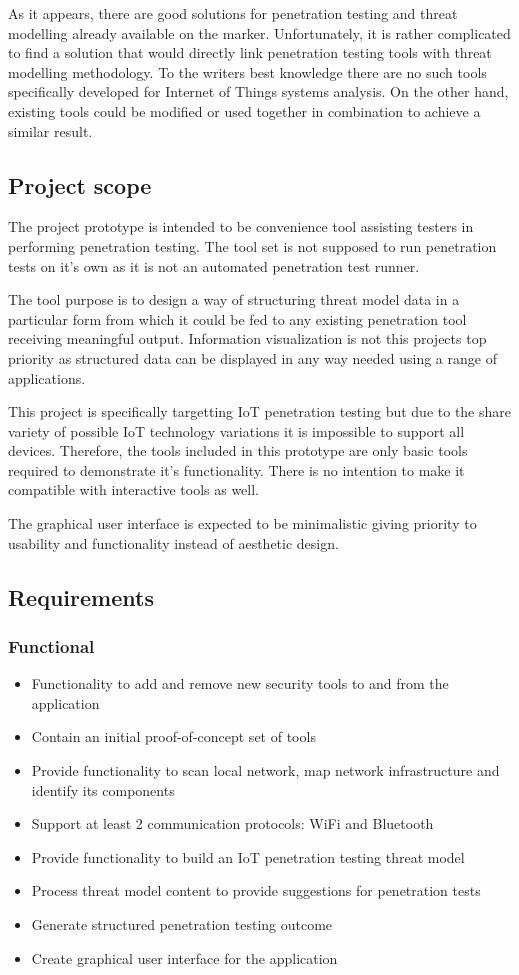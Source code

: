 	As it appears, there are good solutions for penetration testing and threat modelling already available on the marker. Unfortunately, it is rather complicated to find a solution that would directly link penetration testing tools with threat modelling methodology. To the writers best knowledge there are no such tools specifically developed for Internet of Things systems analysis. On the other hand, existing tools could be modified or used together in combination to achieve a similar result.


\subsection{Project scope}
	The project prototype is intended to be convenience tool assisting testers in performing penetration testing. The tool set is not supposed to run penetration tests on it's own as it is not an automated penetration test runner. 
	
	The tool purpose is to design a way of structuring threat model data in a particular form from which it could be fed to any existing penetration tool receiving meaningful output. Information visualization is not this projects top priority as structured data can be displayed in any way needed using a range of applications.
	
	This project is specifically targetting IoT penetration testing but due to the share variety of possible IoT technology variations it is impossible to support all devices. Therefore, the tools included in this prototype are only basic tools required to demonstrate it's functionality. There is no intention to make it compatible with interactive tools as well. 
	
	The graphical user interface is expected to be minimalistic giving priority to usability and functionality instead of aesthetic design.

\subsection{Requirements}
	\subsubsection{Functional}
	\begin{itemize}
		\item Functionality to add and remove new security tools to and from the application
		\item Contain an initial proof-of-concept set of tools
		\item Provide functionality to scan local network, map network infrastructure and identify its components
		\item Support at least 2 communication protocols: WiFi and Bluetooth
		\item Provide functionality to build an IoT penetration testing threat model
		\item Process threat model content to provide suggestions for penetration tests
		\item Generate structured penetration testing outcome
		\item Create graphical user interface for the application
	\end{itemize}
	
